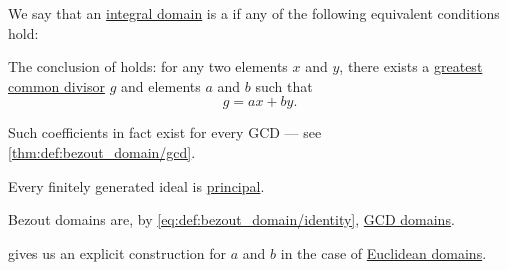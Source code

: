\begin{definition}\label{def:bezout_domain}
  We say that an \hyperref[def:integral_domain]{integral domain} is a  if any of the following equivalent conditions hold:
  \begin{thmenum}
    \mimprovised The conclusion of  holds: for any two elements \( x \) and \( y \), there exists a \hyperref[def:gcd]{greatest common divisor} \( g \) and elements \( a \) and \( b \) such that
    \begin{equation}\label{eq:def:bezout_domain/identity}
      g = ax + by.
    \end{equation}

    Such coefficients in fact exist for every GCD --- see \cref{thm:def:bezout_domain/gcd}.

     Every finitely generated ideal is \hyperref[def:semiring_ideal/principal]{principal}.
  \end{thmenum}
\end{definition}
\begin{comments}
  \item Bezout domains are, by \eqref{eq:def:bezout_domain/identity}, \hyperref[def:gcd_domain]{GCD domains}.

  \item {} gives us an explicit construction for \( a \) and \( b \) in the case of \hyperref[def:euclidean_domain]{Euclidean domains}.
\end{comments}
